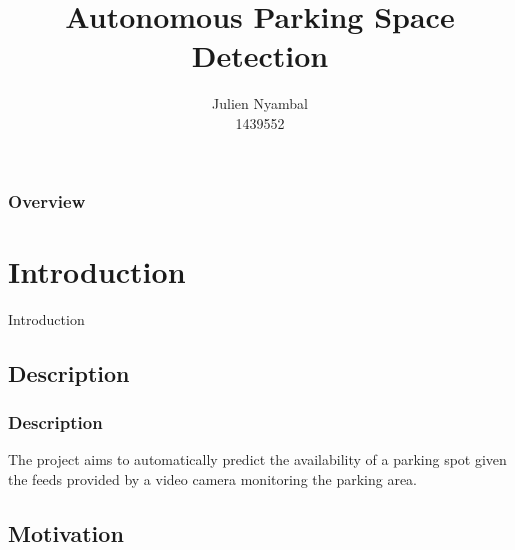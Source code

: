 \documentclass{beamer}
\title[Autononous Parking Space Detection]{Autonomous Parking Space Detection} %
\author{Julien Nyambal\\1439552} %
\institute[WITS] %
{
School of Computer Science and Applied Mathematics\\ %
University of the Witwatersrand, Johannesburg \\
\medskip
Supervisor: Dr. Richard Klein
}
\date[\today]{} %
\begin{document}
\begin{frame}
\titlepage %
\end{frame}

\begin{frame}
\frametitle{Overview} %
\tableofcontents %
\end{frame}


\section{Introduction} %

\begin{frame}
\Huge Introduction
\end{frame}

\subsection{Description}

\begin{frame}
\frametitle{Description}

The project aims to automatically predict the availability of a parking spot given the feeds provided by a video camera monitoring the parking area. 

\end{frame}

\subsection{Motivation}
\end{document}
